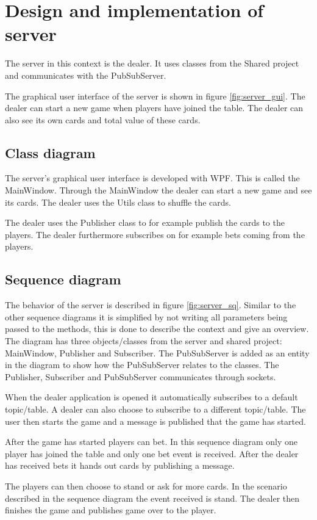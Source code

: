 \FloatBarrier

\section{Design and implementation of server}
The server in this context is the dealer. It uses classes from the Shared project and communicates with the PubSubServer.

The graphical user interface of the server is shown in figure \ref{fig:server_gui}. The dealer can start a new game when players have joined the table. The dealer can also see its own cards and total value of these cards.  

\FloatBarrier

\subsection{Class diagram}
The server's graphical user interface is developed with WPF. This is called the MainWindow. Through the MainWindow the dealer can start a new game and see its cards. The dealer uses the Utils class to shuffle the cards. 

The dealer uses the Publisher class to for example publish the cards to the players. The dealer furthermore subscribes on for example bets coming from the players.

\FloatBarrier

\subsection{Sequence diagram}
The behavior of the server is described in figure \ref{fig:server_sq}. Similar to the other sequence diagrams it is simplified by not writing all parameters being passed to the methods, this is done to describe the context and give an overview. The diagram has three objects/classes from the server and shared project: MainWindow, Publisher and Subscriber. The PubSubServer is added as an entity in the diagram to show how the PubSubServer relates to the classes. The Publisher, Subscriber and PubSubServer communicates through sockets.

When the dealer application is opened it automatically subscribes to a default topic/table. A dealer can also choose to subscribe to a different topic/table. The user then starts the game and a message is published that the game has started.

After the game has started players can bet. In this sequence diagram only one player has joined the table and only one bet event is received. After the dealer has received bets it hands out cards by publishing a message. 

The players can then choose to stand or ask for more cards. In the scenario described in the sequence diagram the event received is stand. The dealer then finishes the game and publishes game over to the player.

\FloatBarrier
